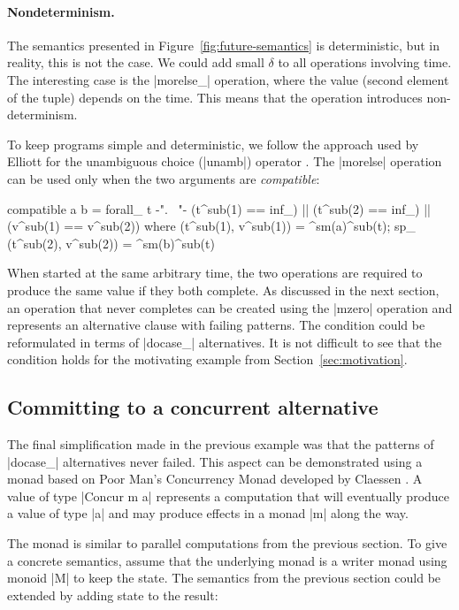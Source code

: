 \documentclass{sigplanconf}
\begin{document}
\paragraph{Nondeterminism.} The semantics presented in Figure~\ref{fig:future-semantics} is 
deterministic, but in reality, this is not the case. We could add small $\delta$ to all operations 
involving time. The interesting case is the |morelse_| operation, where the value (second element 
of the tuple) depends on the time. This means that the operation introduces non-determinism.

To keep programs simple and deterministic, we follow the approach used by Elliott for the unambiguous 
choice (|unamb|) operator \cite{push-pull-frp}. The |morelse| operation can be used only when the 
two arguments are \textit{compatible}:

\begin{code}
compatible a b = forall_ t {-". \ "-} (t^sub(1) == inf_) || (t^sub(2) == inf_) || (v^sub(1) == v^sub(2))
	where  (t^sub(1), v^sub(1)) = ^sm(a)^sub(t); sp_ (t^sub(2), v^sub(2)) = ^sm(b)^sub(t)
\end{code}
When started at the same arbitrary time, the two operations are required to produce the same value if they
both complete. As discussed in the next section, an operation that never completes can be created 
using the |mzero| operation and represents an alternative clause with failing patterns. 
The condition could be reformulated in terms of |docase_| alternatives. It is not difficult to 
see that the condition holds for the motivating example from Section~\ref{sec:motivation}.


\subsection{Committing to a concurrent alternative}
\label{sec:intro-commit-poorman}

The final simplification made in the previous example was that the patterns of |docase_| alternatives 
never failed. This aspect can be demonstrated using a monad based on Poor Man's Concurrency 
Monad developed by Claessen \cite{poorman}. A value of type |Concur m a| represents a computation 
that will eventually produce a value of type |a| and may produce effects in a monad |m| along the way. 

The monad is similar to parallel computations from the previous section. To give a concrete semantics, 
assume that the underlying monad is a writer monad using monoid |M| to keep the state. The semantics from 
the previous section could be extended by adding state to the result:
\end{document}
